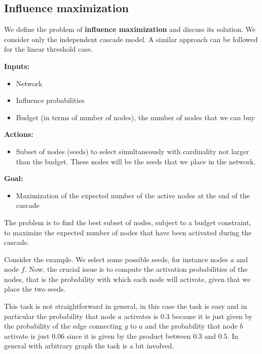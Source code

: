 \documentclass[10pt,a4paper]{article}
\begin{document}
\subsection{Influence maximization}\label{influence-maximization}

We define the problem of \textbf{influence maximization} and discuss its solution. We consider only the independent cascade model. A similar approach can be followed for the linear threshold case.
\newline

\textbf{Inputs:}
\begin{itemize}
\item Network
\item Influence probabilities
\item Budget (in terms of number of nodes), the number of nodes that we can buy
\end{itemize}

\textbf{Actions:}
\begin{itemize}
\item Subset of nodes (seeds) to select simultaneously with cardinality not larger than the budget. These nodes will be the seeds that we place in the network.
\end{itemize}

\textbf{Goal:}
\begin{itemize}
\item Maximization of the expected number of the active nodes at the end of the cascade
\end{itemize}

The problem is to find the best subset of nodes, subject to a budget constraint, to maximize the expected number of nodes that have been activated during the cascade.

Consider the example. We select some possible seeds, for instance nodes $a$ and node $f$. Now, the crucial issue is to compute the activation probabilities of the nodes, that is the probability with which each node will activate, given that we place the two seeds.

This task is not straightforward in general, in this case the task is easy and in particular the probability that node $a$ activates is $0.3$ because it is just given by the probability of the edge connecting $g$ to $a$ and the probability that node $b$ activate is just $0.06$ since it is given by the product between $0.3$ and
$0.5$. In general with arbitrary graph the task is a bit involved.
\end{document}
